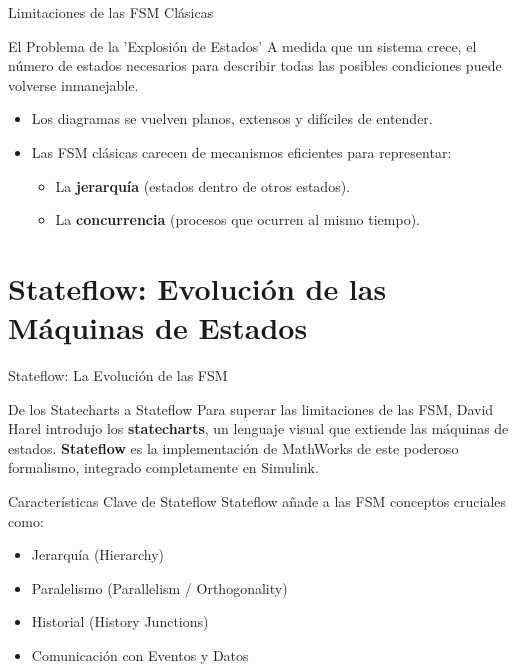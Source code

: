 \documentclass[aspectratio=169,xcolor=dvipsnames]{beamer}
\begin{document}

\begin{frame}{Limitaciones de las FSM Clásicas}
    \begin{alertblock}{El Problema de la 'Explosión de Estados'}
    A medida que un sistema crece, el número de estados necesarios para describir todas las posibles condiciones puede volverse inmanejable.
    \end{alertblock}

    \begin{itemize}
        \item Los diagramas se vuelven planos, extensos y difíciles de entender.
        \item Las FSM clásicas carecen de mecanismos eficientes para representar:
            \begin{itemize}
                \item La \textbf{jerarquía} (estados dentro de otros estados).
                \item La \textbf{concurrencia} (procesos que ocurren al mismo tiempo).
            \end{itemize}
    \end{itemize}
\end{frame}

\section{Stateflow: Evolución de las Máquinas de Estados}

\begin{frame}{Stateflow: La Evolución de las FSM}
    \begin{block}{De los Statecharts a Stateflow}
    Para superar las limitaciones de las FSM, David Harel introdujo los \textbf{statecharts}, un lenguaje visual que extiende las máquinas de estados. \textbf{Stateflow} es la implementación de MathWorks de este poderoso formalismo, integrado completamente en Simulink.
    \end{block}
    
    \begin{alertblock}{Características Clave de Stateflow}
    Stateflow añade a las FSM conceptos cruciales como:
        \begin{itemize}
            \item Jerarquía (Hierarchy)
            \item Paralelismo (Parallelism / Orthogonality)
            \item Historial (History Junctions)
            \item Comunicación con Eventos y Datos
        \end{itemize}
    \end{alertblock}
\end{frame}
\end{document}
